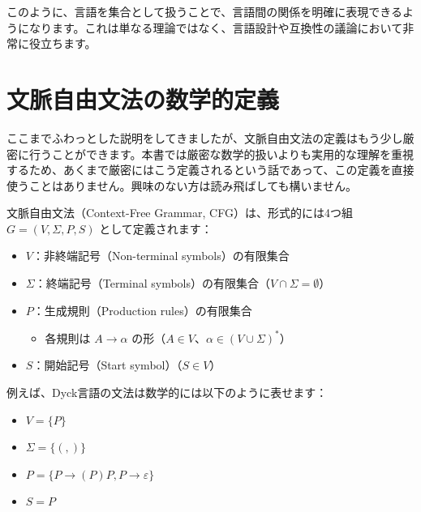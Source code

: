 このように、言語を集合として扱うことで、言語間の関係を明確に表現できるようになります。これは単なる理論ではなく、言語設計や互換性の議論において非常に役立ちます。

\hypertarget{chapter4-ux6587ux8108ux81eaux7531ux6587ux6cd5ux306eux6570ux5b66ux7684ux5b9aux7fa9}{%
\section{文脈自由文法の数学的定義}\label{chapter4-ux6587ux8108ux81eaux7531ux6587ux6cd5ux306eux6570ux5b66ux7684ux5b9aux7fa9}}

ここまでふわっとした説明をしてきましたが、文脈自由文法の定義はもう少し厳密に行うことができます。本書では厳密な数学的扱いよりも実用的な理解を重視するため、あくまで厳密にはこう定義されるという話であって、この定義を直接使うことはありません。興味のない方は読み飛ばしても構いません。

文脈自由文法（Context-Free Grammar, CFG）は、形式的には4つ組
\(G = (V, \Sigma, P, S)\) として定義されます：

\begin{itemize}
\tightlist
\item
  \(V\)：非終端記号（Non-terminal symbols）の有限集合
\item
  \(\Sigma\)：終端記号（Terminal
  symbols）の有限集合（\(V \cap \Sigma = \emptyset\)）
\item
  \(P\)：生成規則（Production rules）の有限集合

  \begin{itemize}
  \tightlist
  \item
    各規則は \(A \rightarrow \alpha\)
    の形（\(A \in V\)、\(\alpha \in (V \cup \Sigma)^*\)）
  \end{itemize}
\item
  \(S\)：開始記号（Start symbol）（\(S \in V\)）
\end{itemize}

例えば、Dyck言語の文法は数学的には以下のように表せます：

\begin{itemize}
\tightlist
\item
  \(V = \{P\}\)
\item
  \(\Sigma = \{(, )\}\)
\item
  \(P = \{P \rightarrow (P)P, P \rightarrow \varepsilon\}\)
\item
  \(S = P\)
\end{itemize}


